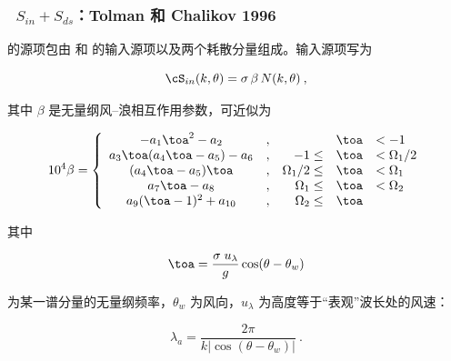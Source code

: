 \vsssub
\subsubsection{~$S_{in} + S_{ds}$：Tolman 和 Chalikov 1996} \label{sec:ST2}
\vsssub


\noindent 
\cite{tol:JPO96} 的源项包由 \cite{art:CB93} 和 \cite{art:Cha95} 的输入源项以及两个耗散分量组成。输入源项写为


\begin{equation}
\cS_{in}(k,\theta) = \sigma \, \beta \, N(k,\theta)
\: , \label{eq:CB93_gen} \end{equation}

\noindent
其中 $\beta$ 是无量纲风--浪相互作用参数，可近似为


\begin{equation}
10^4 \beta = \left \{
\begin{array}{ccrcl}
-a_1\toa^2 -a_2          &,&             & \toa & < -1     \\
a_3\toa(a_4\toa-a_5)-a_6 &,&         -1 \leq & \toa & <\Omega_1/2 \\
(a_4\toa-a_5)\toa        &,& \Omega_1/2 \leq & \toa & <\Omega_1   \\
a_7\toa-a_8              &,&   \Omega_1 \leq & \toa & <\Omega_2   \\
a_9(\toa-1)^2+a_{10}     &,&   \Omega_2 \leq & \toa &
\end{array} \right . \label{eq:CB93_beta}
\end{equation}

\noindent
其中


\begin{equation}
\toa= \frac{\sigma \; u_{\lambda}}{g} \cos(\theta-\theta_w)
\label{eq:CB93_oma} \end{equation}

\noindent
为某一谱分量的无量纲频率，$\theta_w$ 为风向，$u_{\lambda}$ 为高度等于“表观”波长处的风速：


\begin{equation}
\lambda_a = \frac{ 2 \pi }{ k | \cos(\theta-\theta_w) | }
\: . \label{eq:CB93_lam} \end{equation}

